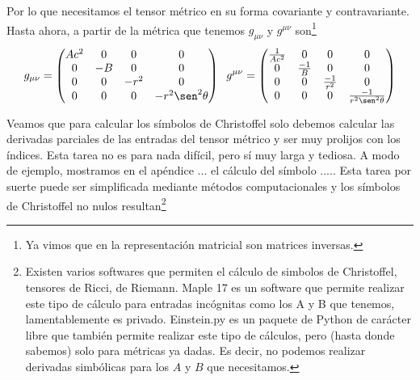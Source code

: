 Por lo que necesitamos el tensor métrico en su forma covariante y contravariante. Hasta ahora, a partir de la métrica que tenemos $g_{\mu\nu}$ y $g^{\mu\nu}$ son\footnote{Ya vimos que en la representación matricial son matrices inversas.} 
\begin{equation}
g_{\mu\nu} = \begin{pmatrix}
Ac^2 & 0 & 0 & 0 \\
0 & -B & 0 & 0 \\
0 & 0 & -r^2 & 0 \\
0 & 0 & 0 & -r^2\sen^2{\theta}
\end{pmatrix}
\hspace{0.2cm}
g^{\mu\nu} = \begin{pmatrix}
\frac{1}{Ac^2} & 0 & 0 & 0 \\
0 & \frac{-1}{B}  & 0 & 0 \\
0 & 0 & \frac{-1}{r^2}  & 0 \\
0 & 0 & 0 & \frac{-1}{r^2\sen^2{\theta}} 
\end{pmatrix}
\label{tensoresmetricos}
\end{equation}

Veamos que para calcular los símbolos de Christoffel solo debemos calcular las derivadas parciales de las entradas del tensor métrico y ser muy prolijos con los índices. Esta tarea no es para nada difícil, pero sí muy larga y tediosa. A modo de ejemplo, mostramos en el apéndice ... el cálculo del símbolo ..... Esta tarea por suerte puede ser simplificada mediante métodos computacionales\cite[][p. 26]{Jhonny} y los símbolos de Christoffel no nulos resultan\footnote{Existen varios softwares que permiten el cálculo de simbolos de Christoffel, tensores de Ricci, de Riemann. Maple 17 es un software que permite realizar este tipo de cálculo para entradas incógnitas como los A y B que tenemos, lamentablemente es privado. Einstein.py es un paquete de Python de carácter libre que también permite realizar este tipo de cálculos, pero (hasta donde sabemos) solo para métricas ya dadas. Es decir, no podemos realizar derivadas simbólicas para los $A$ y $B$ que necesitamos.} 

